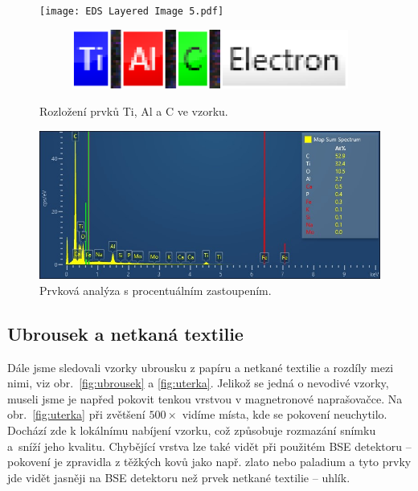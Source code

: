 \documentclass[a4paper,12pt]{article}
\begin{document}
\begin{figure}[h!]
	\centering
	\texttt{[image: EDS Layered Image 5.pdf]}

	\begin{subfigure}{0.2\textwidth}
		\vspace*{-60mm}
		\hspace*{65mm}
		\includegraphics[width=\textwidth]{legend.png}
	\end{subfigure}
	\caption{\centering Rozložení prvků Ti, Al a C ve vzorku.}
	\label{fig:EDX_tot}
\end{figure}

\begin{figure}[h!]
	\centering
	\includegraphics[width=\textwidth]{Map Sum Spectrum.jpeg}
	\caption{\centering Prvková analýza s procentuálním zastoupením.}
	\label{fig:spectrum}
\end{figure}

\subsection{Ubrousek a netkaná textilie}\noindent
Dále jsme sledovali vzorky ubrousku z papíru a netkané textilie a rozdíly mezi 
nimi, viz obr.~\ref{fig:ubrousek} a \ref{fig:uterka}. Jelikož se 
jedná o nevodivé vzorky, museli jsme je napřed pokovit tenkou vrstvou v 
magnetronové naprašovačce. Na obr.~\ref{fig:uterka} při zvětšení $500\times$ 
vidíme místa, kde se pokovení neuchytilo. Dochází zde k lokálnímu nabíjení 
vzorku, což způsobuje rozmazání snímku a~sníží jeho kvalitu. Chybějící vrstva 
lze také 
vidět při použitém BSE 
detektoru -- pokovení je zpravidla z těžkých kovů jako např. zlato nebo 
paladium a 
tyto prvky jde vidět jasněji na BSE detektoru než prvek netkané textilie -- 
uhlík.
\end{document}
